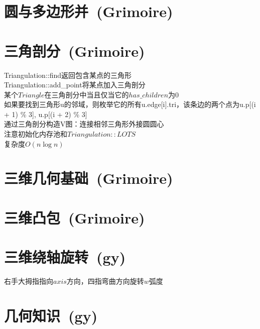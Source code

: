 \section{圆与多边形并\ \small(Grimoire)}

\section{三角剖分\ \small(Grimoire)}
    \noindent Triangulation::find返回包含某点的三角形
    \\Triangulation::add\_point将某点加入三角剖分
    \\某个$ Triangle $在三角剖分中当且仅当它的$ has\_children $为$ 0 $
    \\如果要找到三角形u的邻域，则枚举它的所有u.edge[i].tri，该条边的两个点为u.p[(i + 1) \% 3], u.p[(i + 2) \% 3]
    \\通过三角剖分构造V图：连接相邻三角形外接圆圆心
    \\注意初始化内存池和$ Triangulation::LOTS $
    \\复杂度$ O(n \log n) $

\section{三维几何基础\ \small(Grimoire)}

\section{三维凸包\ \small(Grimoire)}

\section{三维绕轴旋转\ \small(gy)}
    右手大拇指指向$ axis $方向，四指弯曲方向旋转$ w $弧度

\section{几何知识\ \small(gy)}
    
